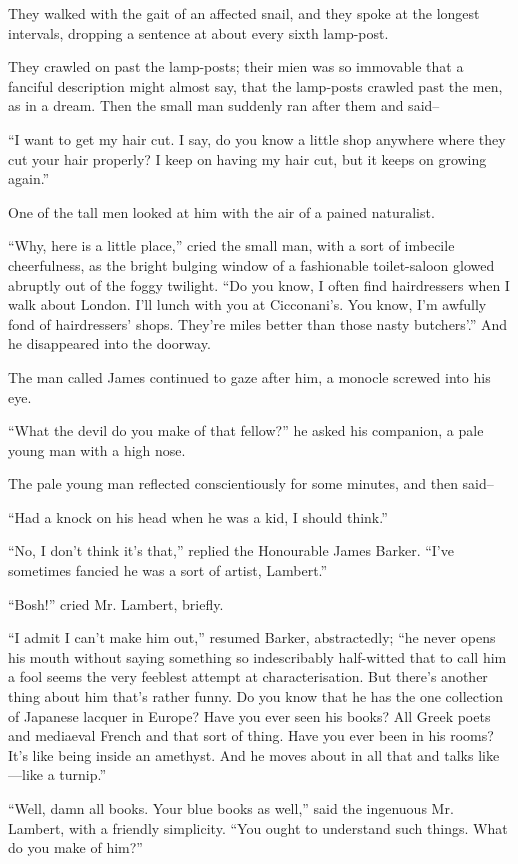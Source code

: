 \documentclass{book}
\begin{document}
They walked with the gait of an affected snail, and they spoke at the longest intervals, dropping a sentence at about every sixth lamp-post.

They crawled on past the lamp-posts; their mien was so immovable that a fanciful description might almost say, that the lamp-posts crawled past the men, as in a dream. Then the small man suddenly ran after them and said–

“I want to get my hair cut. I say, do you know a little shop anywhere where they cut your hair properly? I keep on having my hair cut, but it keeps on growing again.”

One of the tall men looked at him with the air of a pained naturalist.

“Why, here is a little place,” cried the small man, with a sort of imbecile cheerfulness, as the bright bulging window of a fashionable toilet-saloon glowed abruptly out of the foggy twilight. “Do you know, I often find hairdressers when I walk about London. I’ll lunch with you at Cicconani’s. You know, I’m awfully fond of hairdressers’ shops. They’re miles better than those nasty butchers’.” And he disappeared into the doorway.

The man called James continued to gaze after him, a monocle screwed into his eye.

“What the devil do you make of that fellow?” he asked his companion, a pale young man with a high nose.

The pale young man reflected conscientiously for some minutes, and then said–

“Had a knock on his head when he was a kid, I should think.”

“No, I don’t think it’s that,” replied the Honourable James Barker. “I’ve sometimes fancied he was a sort of artist, Lambert.”

“Bosh!” cried Mr. Lambert, briefly.

“I admit I can’t make him out,” resumed Barker, abstractedly; “he never opens his mouth without saying something so indescribably half-witted that to call him a fool seems the very feeblest attempt at characterisation. But there’s another thing about him that’s rather funny. Do you know that he has the one collection of Japanese lacquer in Europe? Have you ever seen his books? All Greek poets and mediaeval French and that sort of thing. Have you ever been in his rooms? It’s like being inside an amethyst. And he moves about in all that and talks like—like a turnip.”

“Well, damn all books. Your blue books as well,” said the ingenuous Mr. Lambert, with a friendly simplicity. “You ought to understand such things. What do you make of him?”
\end{document}
